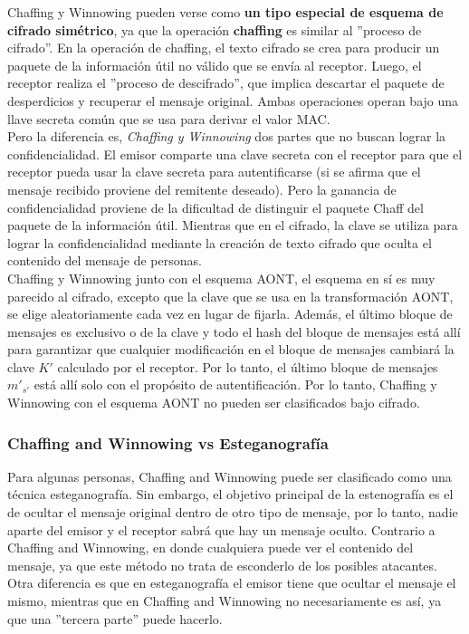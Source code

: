 \documentclass[12pt, a4paper, titlepage]{report}
\begin{document}
        Chaffing y Winnowing pueden verse como \textbf{un tipo especial de esquema de cifrado simétrico}, ya que la operación \textbf{chaffing} es similar al ''proceso de cifrado''. En la operación de chaffing, el texto cifrado se crea para producir un paquete de la informaci\'on \'util no válido que se envía al receptor. Luego, el receptor realiza el ''proceso de descifrado'', que implica descartar el paquete de desperdicios y recuperar el mensaje original. Ambas operaciones operan bajo una llave secreta común que se usa para derivar el valor MAC.\\
        
        Pero la diferencia es, \textit{Chaffing y Winnowing} dos partes que no buscan lograr la confidencialidad. El emisor comparte una clave secreta con el receptor para que el receptor pueda usar la clave secreta para autentificarse (si se afirma que el mensaje recibido proviene del remitente deseado). Pero la ganancia de confidencialidad proviene de la dificultad de distinguir el paquete Chaff del paquete de la informaci\'on \'util. Mientras que en el cifrado, la clave se utiliza para lograr la confidencialidad mediante la creación de texto cifrado que oculta el contenido del mensaje de personas.\\
        
        Chaffing y Winnowing junto con el esquema AONT, el esquema en sí es muy parecido al cifrado, excepto que la clave que se usa en la transformación AONT, se elige aleatoriamente cada vez en lugar de fijarla. Además, el último bloque de mensajes es exclusivo o de la clave y todo el hash del bloque de mensajes está allí para garantizar que cualquier modificación en el bloque de mensajes cambiará la clave $K'$ calculado por el receptor. Por lo tanto, el último bloque de mensajes ${m'}_{s'}$ está allí solo con el propósito de autentificación. Por lo tanto, Chaffing y Winnowing con el esquema AONT no pueden ser clasificados bajo cifrado.\\
        
        \subsubsection{Chaffing and Winnowing vs Esteganograf\'ia}
        
        Para algunas personas, Chaffing and Winnowing puede ser clasificado como una técnica esteganograf\'ia. Sin embargo, el objetivo principal de la estenografía es el de ocultar el mensaje original dentro de otro tipo de mensaje, por lo tanto, nadie aparte del emisor y el receptor sabrá que hay un mensaje oculto. Contrario a Chaffing and Winnowing, en donde cualquiera puede ver el contenido del mensaje, ya que este método no trata de esconderlo de los posibles atacantes. Otra diferencia es que en esteganograf\'ia el emisor tiene que ocultar el mensaje el mismo, mientras que en Chaffing and Winnowing no necesariamente es así, ya que una ''tercera parte'' puede hacerlo.\\
        
\end{document}
